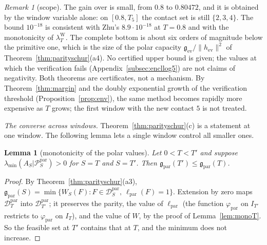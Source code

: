 \documentclass[11pt]{amsart}
\newtheorem{lemma}[theorem]{Lemma}
\theoremstyle{definition}
\theoremstyle{remark}
\newtheorem{remark}[theorem]{Remark}
\newcommand{\IT}{I_T}
\newcommand{\lamW}{\lambda^{\mathrm W}_T}
\begin{document}
\begin{remark}[scope]\label{rem:log5scope}
The gain over \cite[Thm.~1.2]{Zhu2026} is small, from $0.8$ to $0.80472$, and it is obtained by the
window variable alone: on $[0.8,T_5]$ the contact set is still $\{2,3,4\}$. The bound
$10^{-18}$ is consistent with Zhu's $8.9\cdot10^{-18}$ at $T=0.8$ and with the monotonicity of
$\lamW$. The complete bottom is about six orders of magnitude below the primitive one, which is the
size of the polar capacity $\mathfrak g_{\mathrm{ev}}/\|h_{\mathrm{ev}}\|^2$ of
Theorem~\ref{thm:parityschur}(a4). No certified upper bound is given; the values at which the
verification fails (Appendix~\ref{subsec:encllog5}) are not claims of negativity. Both theorems are
certificates, not a mechanism. By Theorem~\ref{thm:margin} and the doubly exponential growth of the
verification threshold (Proposition~\ref{prop:env}), the same method becomes rapidly more expensive as $T$
grows; the first window with the new contact $5$ is not treated.
\end{remark}

\emph{The converse across windows.} Theorem~\ref{thm:parityschur}(c) is a statement at one window. The
following lemma lets a single window control all smaller ones.

\begin{lemma}[monotonicity of the polar values]\label{lem:gmono}
Let $0<T<T'$ and suppose $\lambda_{\min}(A_S|\mathcal P^{\mathrm{par}}_S)>0$ for $S=T$ and $S=T'$. Then
$\mathfrak g_{\mathrm{par}}(T')\le\mathfrak g_{\mathrm{par}}(T)$.
\end{lemma}
\begin{proof}
By Theorem~\ref{thm:parityschur}(a3),
$\mathfrak g_{\mathrm{par}}(S)=\min\{W_S(F):F\in\mathcal D^{\mathrm{par}}_S,\ \ell_{\mathrm{par}}(F)=1\}$. Extension by
zero maps $\mathcal D^{\mathrm{par}}_T$ into $\mathcal D^{\mathrm{par}}_{T'}$; it preserves the parity, the value of
$\ell_{\mathrm{par}}$ (the function $\varphi_{\mathrm{par}}$ on $I_{T'}$ restricts to $\varphi_{\mathrm{par}}$ on $\IT$),
and the value of $W$, by the proof of Lemma~\ref{lem:monoT}. So the feasible set at $T'$ contains that at
$T$, and the minimum does not increase.
\end{proof}
\end{document}

